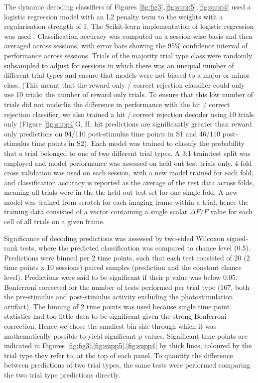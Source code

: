 The dynamic decoding classifiers of Figures \ref{fig:fig3},\ref{fig:supp5},\ref{fig:supp4} used a logistic regression model with an L2 penalty term to the weights with a regularisation strength of 1. The Scikit-learn implementation of logistic regression was used \cite{pedregosa_scikit-learn_2012}. Classification accuracy was computed on a session-wise basis and then averaged across sessions, with error bars showing the 95\% confidence interval of performance across sessions. Trials of the majority trial type class were randomly subsampled to adjust for sessions in which there was an unequal number of different trial types and ensure that models were not biased to a major or minor class. (This meant that the reward only / correct rejection classifier could only use 10 trials: the number of reward only trials. To ensure that this low number of trials did not underlie the difference in performance with the hit / correct rejection classifier, we also trained a hit / correct rejection decoder using 10 trials only (Figure \ref{fig:supp4}G, H; hit predictions are significantly greater than reward only predictions on 94/110 post-stimulus time points in S1 and 46/110 post-stimulus time points in S2). Each model was trained to classify the probability that a trial belonged to one of two different trial types. A 3:1 train:test split was employed and model performance was assessed on held out test trials only. 4-fold cross validation was used on each session, with a new model trained for each fold, and classification accuracy is reported as the average of the test data across folds, meaning all trials were in the the held-out test set for one single fold. A new model was trained from scratch for each imaging frame within a trial, hence the training data consisted of a vector containing a single scalar $\Delta F/F$ value for each cell of all trials on a given frame.

Significance of decoding predictions was assessed by two-sided Wilcoxon signed-rank tests, where the predicted classification was compared  to chance level (0.5). Predictions were binned per 2 time points, such that each test consisted of 20 (2 time points x 10 sessions) paired samples (prediction and the constant chance level). Predictions were said to be significant if their p value was below 0.05, Bonferroni corrected for the number of tests performed per trial type (167, both the pre-stimulus and post-stimulus activity excluding the photostimulation artifact). The binning of 2 time points was used because single time point statistics had too little data to be significant given the strong Bonferroni correction. Hence we chose the smallest bin size through which it was mathematically possible to yield significant p values. Significant time points are indicated in Figures \ref{fig:fig3},\ref{fig:supp5},\ref{fig:supp4} by thick lines, coloured by the trial type they refer to, at the top of each panel. To quantify the difference between predictions of two trial types, the same tests were performed comparing the two trial type predictions directly.


